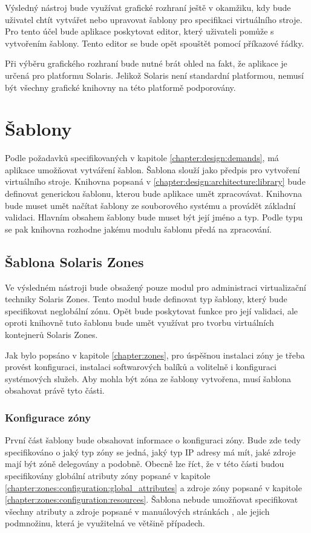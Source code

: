 Výsledný nástroj bude využívat grafické rozhraní ještě v okamžiku, kdy bude uživatel chtít vytvářet nebo upravovat šablony pro
specifikaci virtuálního stroje. Pro tento účel bude aplikace poskytovat editor, který uživateli pomůže s vytvořením šablony.
Tento editor se bude opět spouštět pomocí příkazové řádky.

Při výběru grafického rozhraní bude nutné brát ohled na fakt, že aplikace je určená pro platformu Solaris. Jelikož Solaris
není standardní platformou, nemusí být všechny grafické knihovny na této platformě podporovány.
\section{Šablony}
\label{chapter:design:templates}
Podle požadavků specifikovaných v kapitole \ref{chapter:design:demands}, má aplikace umožňovat vytváření šablon. Šablona slouží
jako předpis pro vytvoření virtuálního stroje. Knihovna popsaná v \ref{chapter:design:architecture:library} bude definovat 
generickou šablonu, kterou bude aplikace umět zpracovávat. Knihovna bude muset umět načítat šablony ze souborového systému
a provádět základní validaci. Hlavním obsahem šablony bude muset být její jméno a typ. Podle typu se pak knihovna rozhodne
jakému modulu šablonu předá na zpracování.
\subsection{Šablona Solaris Zones}
\label{chapter:design:templates:zones}
Ve výsledném nástroji bude obsažený pouze modul pro administraci virtualizační techniky Solaris Zones. Tento modul bude
definovat typ šablony, který bude specifikovat neglobální zónu. Opět bude poskytovat funkce pro její validaci, ale oproti
knihovně tuto šablonu bude umět využívat pro tvorbu virtuálních kontejnerů Solaris Zones.

Jak bylo popsáno v kapitole \ref{chapter:zones}, pro úspěšnou instalaci zóny je třeba provést konfiguraci, instalaci 
softwarových balíků a volitelně i konfiguraci systémových služeb. Aby mohla být zóna ze šablony vytvořena, musí šablona obsahovat
právě tyto části.
\subsubsection{Konfigurace zóny}
\label{chapter:design:templates:zones:configuration}
První část šablony bude obsahovat informace o konfiguraci zóny. Bude zde tedy specifikováno o jaký typ zóny se jedná,
jaký typ IP adresy má mít, jaké zdroje mají být zóně delegovány a podobně. Obecně lze říct, že v této části budou specifikovány
globální atributy zóny popsané v kapitole \ref{chapter:zones:configuration:global_attributes} a zdroje zóny popsané v kapitole
\ref{chapter:zones:configuration:resources}. Šablona nebude umožňovat specifikovat všechny atributy a zdroje popsané v 
manuálových stránkách \cite{oracle:manpages:zonecfg}, ale jejich podmnožinu, která je využitelná ve většině případech.
